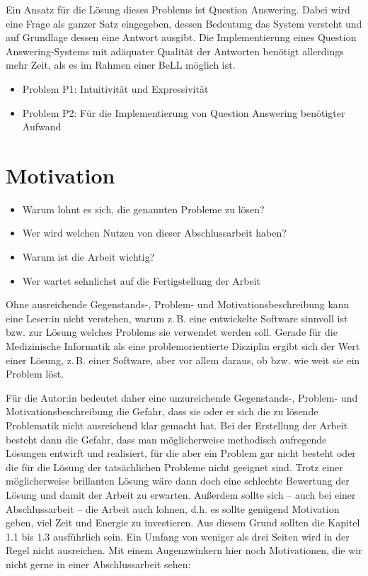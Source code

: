 Ein Ansatz für die Lösung dieses Problems ist Question Answering.
Dabei wird eine Frage als ganzer Satz eingegeben, dessen Bedeutung das System versteht und auf Grundlage dessen eine Antwort ausgibt.
Die Implementierung eines Question Answering-Systems mit adäquater Qualität der Antworten benötigt allerdings mehr Zeit, als es im Rahmen einer BeLL möglich ist.

\begin{itemize}
\item Problem P1: Intuitivität und Expressivität
\item Problem P2: Für die Implementierung von Question Answering benötigter Aufwand
\end{itemize}


\section{Motivation}

\begin{itemize}
\item Warum lohnt es sich, die genannten Probleme zu lösen?
\item Wer wird welchen Nutzen von dieser Abschlussarbeit haben?
\item Warum ist die Arbeit wichtig?
\item Wer wartet sehnlichst auf die Fertigstellung der Arbeit
\end{itemize}

Ohne ausreichende Gegenstands-, Problem- und Motivationsbeschreibung kann eine Leser:in nicht verstehen, warum z.\,B. eine entwickelte Software sinnvoll ist bzw. zur Lösung welches Problems sie verwendet werden soll.
Gerade für die Medizinische Informatik als eine problemorientierte Disziplin ergibt sich der Wert einer Lösung, z.\,B. einer Software, aber vor allem daraus, ob bzw. wie weit sie ein Problem löst.

Für die Autor:in bedeutet daher eine unzureichende Gegenstands-, Problem- und Motivationsbeschreibung die Gefahr, dass sie oder er sich die zu lösende Problematik nicht ausreichend klar gemacht hat.
Bei der Erstellung der Arbeit besteht dann die Gefahr, dass man möglicherweise methodisch aufregende Lösungen entwirft und realisiert, für die aber ein Problem gar nicht besteht oder die für die Lösung der tatsächlichen Probleme nicht geeignet sind.
Trotz einer möglicherweise brillanten Lösung wäre dann doch eine schlechte Bewertung der Lösung und damit der Arbeit zu erwarten.
Außerdem sollte sich -- auch bei einer Abschlussarbeit -- die Arbeit auch lohnen, d.h. es sollte genügend Motivation geben, viel Zeit und Energie zu investieren.
Aus diesem Grund sollten die Kapitel 1.1 bis 1.3 ausführlich sein.
Ein Umfang von weniger als drei Seiten wird in der Regel nicht ausreichen.
Mit einem Augenzwinkern hier noch Motivationen, die wir nicht gerne in einer Abschlussarbeit sehen:\\
~~\\

